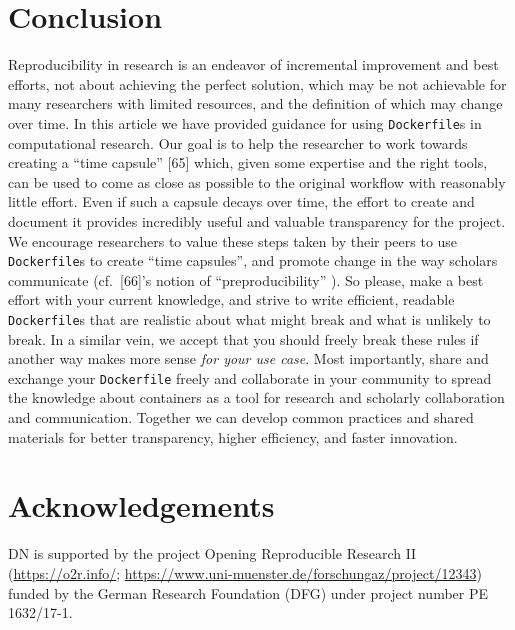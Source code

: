 \documentclass[10pt,letterpaper]{article}
\begin{document}
\hypertarget{conclusion}{%
\section*{Conclusion}\label{conclusion}}

Reproducibility in research is an endeavor of incremental improvement
and best efforts, not about achieving the perfect solution, which may be
not achievable for many researchers with limited resources, and the
definition of which may change over time. In this article we have
provided guidance for using \texttt{Dockerfile}s in computational
research. Our goal is to help the researcher to work towards creating a
``time capsule'' {[}65{]} which, given some expertise and the right
tools, can be used to come as close as possible to the original workflow
with reasonably little effort. Even if such a capsule decays over time,
the effort to create and document it provides incredibly useful and
valuable transparency for the project. We encourage researchers to value
these steps taken by their peers to use \texttt{Dockerfile}s to create
``time capsules'', and promote change in the way scholars communicate
(cf.~{[}66{]}'s notion of ``preproducibility'' ). So please, make a best
effort with your current knowledge, and strive to write efficient,
readable \texttt{Dockerfile}s that are realistic about what might break
and what is unlikely to break. In a similar vein, we accept that you
should freely break these rules if another way makes more sense
\emph{for your use case}. Most importantly, share and exchange your
\texttt{Dockerfile} freely and collaborate in your community to spread
the knowledge about containers as a tool for research and scholarly
collaboration and communication. Together we can develop common
practices and shared materials for better transparency, higher
efficiency, and faster innovation.

\hypertarget{acknowledgements}{%
\section*{Acknowledgements}\label{acknowledgements}}

DN is supported by the project Opening Reproducible Research II
(\href{https://o2r.info/}{https://o2r.info/};
\href{https://www.uni-muenster.de/forschungaz/project/12343}{https://www.uni-muenster.de/forschungaz/project/12343})
funded by the German Research Foundation (DFG) under project number PE
1632/17-1.
\end{document}
